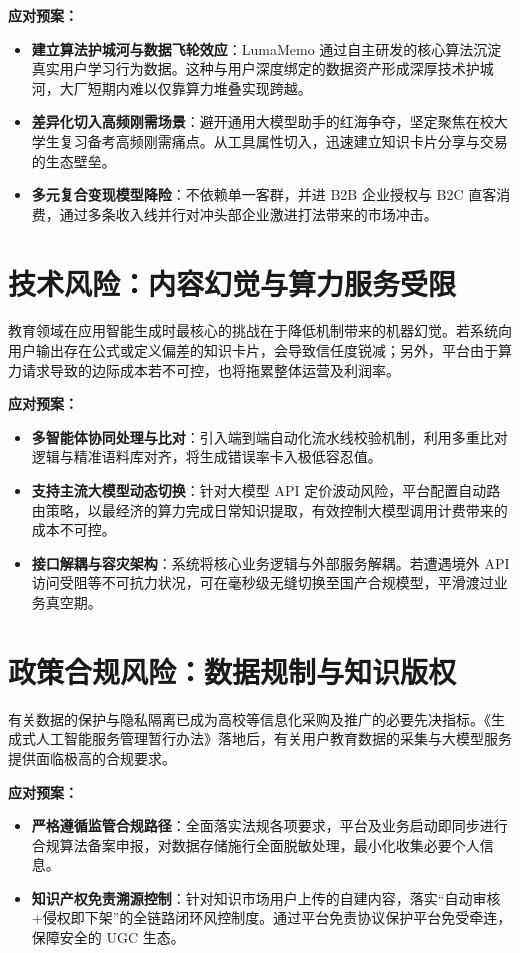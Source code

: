 \textbf{应对预案：}
\begin{itemize}
    \item \textbf{建立算法护城河与数据飞轮效应}：LumaMemo 通过自主研发的核心算法沉淀真实用户学习行为数据。这种与用户深度绑定的数据资产形成深厚技术护城河，大厂短期内难以仅靠算力堆叠实现跨越。
    \item \textbf{差异化切入高频刚需场景}：避开通用大模型助手的红海争夺，坚定聚焦在校大学生复习备考高频刚需痛点。从工具属性切入，迅速建立知识卡片分享与交易的生态壁垒。
    \item \textbf{多元复合变现模型降险}：不依赖单一客群，并进 B2B 企业授权与 B2C 直客消费，通过多条收入线并行对冲头部企业激进打法带来的市场冲击。
\end{itemize}

\section{技术风险：内容幻觉与算力服务受限}

教育领域在应用智能生成时最核心的挑战在于降低机制带来的机器幻觉。若系统向用户输出存在公式或定义偏差的知识卡片，会导致信任度锐减；另外，平台由于算力请求导致的边际成本若不可控，也将拖累整体运营及利润率。

\textbf{应对预案：}
\begin{itemize}
    \item \textbf{多智能体协同处理与比对}：引入端到端自动化流水线校验机制，利用多重比对逻辑与精准语料库对齐，将生成错误率卡入极低容忍值。
    \item \textbf{支持主流大模型动态切换}：针对大模型 API 定价波动风险，平台配置自动路由策略，以最经济的算力完成日常知识提取，有效控制大模型调用计费带来的成本不可控。
    \item \textbf{接口解耦与容灾架构}：系统将核心业务逻辑与外部服务解耦。若遭遇境外 API 访问受阻等不可抗力状况，可在毫秒级无缝切换至国产合规模型，平滑渡过业务真空期。
\end{itemize}

\section{政策合规风险：数据规制与知识版权}

有关数据的保护与隐私隔离已成为高校等信息化采购及推广的必要先决指标。《生成式人工智能服务管理暂行办法》落地后，有关用户教育数据的采集与大模型服务提供面临极高的合规要求。

\textbf{应对预案：}
\begin{itemize}
    \item \textbf{严格遵循监管合规路径}：全面落实法规各项要求，平台及业务启动即同步进行合规算法备案申报，对数据存储施行全面脱敏处理，最小化收集必要个人信息。
    \item \textbf{知识产权免责溯源控制}：针对知识市场用户上传的自建内容，落实“自动审核+侵权即下架”的全链路闭环风控制度。通过平台免责协议保护平台免受牵连，保障安全的 UGC 生态。
\end{itemize}


